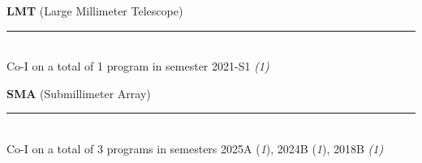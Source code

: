 \documentclass[11pt]{article}
\makeatletter
\def\vhrulefill#1{\leavevmode\leaders\hrule\@height#1\hfill \kern\z@}
\makeatother
\begin{document}

{\bf LMT} {\small (Large Millimeter Telescope)} \vhrulefill{0.5pt}\\
Co-I on a total of 1 program in semester 2021-S1 {\em(1)}



{\bf SMA} {\small (Submillimeter Array)} \vhrulefill{0.5pt}\\
Co-I on a total of 3 programs in semesters 2025A ({\em1}), 2024B ({\em1}), 2018B {\em(1)}
\end{document}
